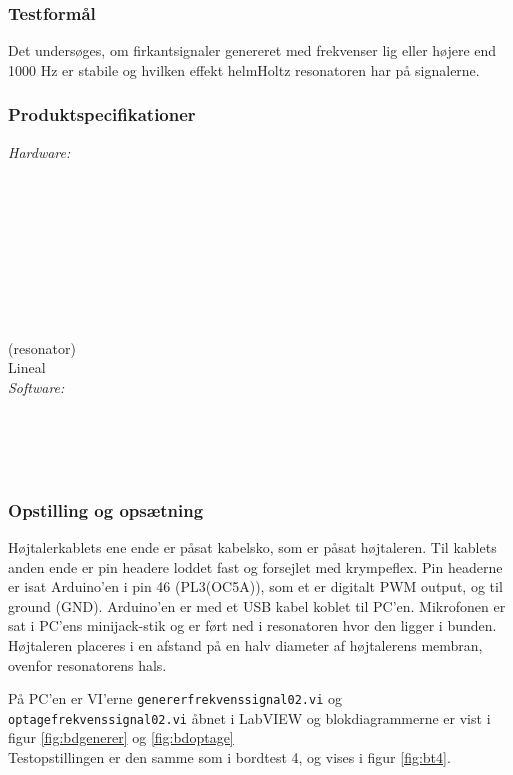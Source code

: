 		\subsubsection{Testformål}
		Det undersøges, om firkantsignaler genereret med frekvenser lig eller højere end 1000 Hz er stabile og hvilken effekt helmHoltz resonatoren har på signalerne. 
		
		\subsubsection{Produktspecifikationer}
		
		\textit{Hardware:}\\
		\tores\\
		\hojtalerkabel\\
		\kabelsko\\
		\pins\\
		\krympeflex\\
		\arduino\\
		\mikrofon\\
		\PC\\
		\usbkabel\\
		 (resonator)\\
		Lineal\\
	
		\textit{Software:}\\
		\labview\\
		\visa\\
		\vi\\
		\ardsw\\
		
		
		\subsubsection{Opstilling og opsætning}
		
		Højtalerkablets ene ende er påsat kabelsko, som er påsat højtaleren. Til kablets anden ende er pin headere loddet fast og forsejlet med krympeflex. Pin headerne er isat Arduino'en i pin 46 (PL3(OC5A)), som et er digitalt PWM output, og til ground (GND). 
		Arduino'en er med et USB kabel koblet til PC'en.	
		Mikrofonen er sat i PC'ens minijack-stik og er ført ned i resonatoren hvor den ligger i bunden. Højtaleren placeres i en afstand på en halv diameter af højtalerens membran, ovenfor resonatorens hals. 
		
		På PC'en er VI'erne \texttt{genererfrekvenssignal02.vi} og \texttt{optagefrekvenssignal02.vi} åbnet i LabVIEW og blokdiagrammerne er vist i figur \ref{fig:bdgenerer} og \ref{fig:bdoptage} \\ Testopstillingen er den samme som i bordtest 4, og vises i figur \ref{fig:bt4}.  
		

